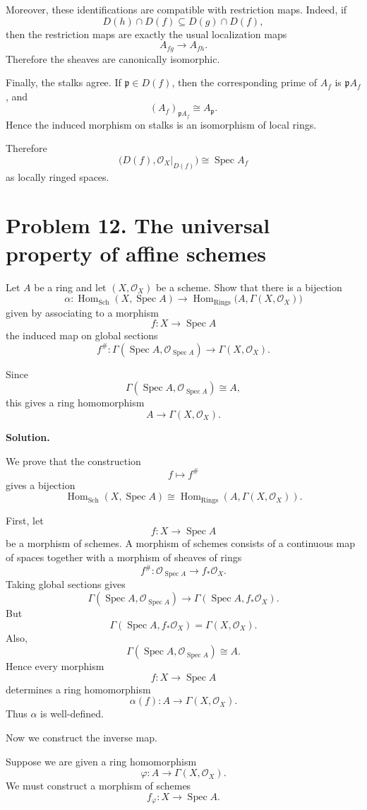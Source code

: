 \documentclass[12pt,a4paper]{article}
\DeclareMathOperator{\Hom}{Hom}
\newcommand{\Spec}{\operatorname{Spec}}
\newcommand{\Sch}{\mathrm{Sch}}
\newcommand{\Rings}{\mathrm{Rings}}
\theoremstyle{notespace}
\begin{document}
Moreover, these identifications are compatible with restriction maps. Indeed, if
\[
D(h)\cap D(f)\subseteq D(g)\cap D(f),
\]
then the restriction maps are exactly the usual localization maps
\[
A_{fg}\longrightarrow A_{fh}.
\]
Therefore the sheaves are canonically isomorphic.

Finally, the stalks agree. If \(\mathfrak p\in D(f)\), then the corresponding prime of \(A_f\) is \(\mathfrak pA_f\), and
\[
(A_f)_{\mathfrak pA_f}\cong A_{\mathfrak p}.
\]
Hence the induced morphism on stalks is an isomorphism of local rings.

Therefore
\[
\boxed{
	\bigl(D(f),\mathcal O_X|_{D(f)}\bigr)\cong \Spec A_f
}
\]
as locally ringed spaces.

\section{Problem 12. The universal property of affine schemes}

Let \(A\) be a ring and let \((X,\mathcal O_X)\) be a scheme. Show that there is a bijection
\[
\alpha:
\Hom_{\Sch}(X,\Spec A)
\longrightarrow
\Hom_{\Rings}\bigl(A,\Gamma(X,\mathcal O_X)\bigr)
\]
given by associating to a morphism
\[
f:X\to \Spec A
\]
the induced map on global sections
\[
f^\#:
\Gamma(\Spec A,\mathcal O_{\Spec A})
\longrightarrow
\Gamma(X,\mathcal O_X).
\]

Since
\[
\Gamma(\Spec A,\mathcal O_{\Spec A})\cong A,
\]
this gives a ring homomorphism
\[
A\to \Gamma(X,\mathcal O_X).
\]

\textbf{Solution.}

We prove that the construction
\[
f\longmapsto f^\#
\]
gives a bijection
\[
\Hom_{\Sch}(X,\Spec A)
\cong
\Hom_{\Rings}(A,\Gamma(X,\mathcal O_X)).
\]

First, let
\[
f:X\to \Spec A
\]
be a morphism of schemes. A morphism of schemes consists of a continuous map of spaces together with a morphism of sheaves of rings
\[
f^\#:\mathcal O_{\Spec A}\to f_*\mathcal O_X.
\]
Taking global sections gives
\[
\Gamma(\Spec A,\mathcal O_{\Spec A})
\longrightarrow
\Gamma(\Spec A,f_*\mathcal O_X).
\]
But
\[
\Gamma(\Spec A,f_*\mathcal O_X)
=
\Gamma(X,\mathcal O_X).
\]
Also,
\[
\Gamma(\Spec A,\mathcal O_{\Spec A})\cong A.
\]
Hence every morphism
\[
f:X\to \Spec A
\]
determines a ring homomorphism
\[
\alpha(f):A\to \Gamma(X,\mathcal O_X).
\]
Thus \(\alpha\) is well-defined.

Now we construct the inverse map.

Suppose we are given a ring homomorphism
\[
\varphi:A\to \Gamma(X,\mathcal O_X).
\]
We must construct a morphism of schemes
\[
f_\varphi:X\to \Spec A.
\]
\end{document}
